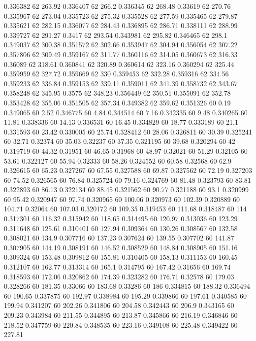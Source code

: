 0.336382 62 263.92
0.336407 62 266.2
0.336345 62 268.48
0.33619 62 270.76
0.335967 62 273.04
0.335723 62 275.32
0.335528 62 277.59
0.335465 62 279.87
0.335621 62 282.15
0.336077 62 284.43
0.336895 62 286.71
0.338111 62 288.99
0.339727 62 291.27
0.3417 62 293.54
0.343981 62 295.82
0.346465 62 298.1
0.349037 62 300.38
0.351572 62 302.66
0.353947 62 304.94
0.356054 62 307.22
0.357806 62 309.49
0.359167 62 311.77
0.360116 62 314.05
0.360673 62 316.33
0.36089 62 318.61
0.360841 62 320.89
0.360614 62 323.16
0.360294 62 325.44
0.359959 62 327.72
0.359669 62 330
0.359453 62 332.28
0.359316 62 334.56
0.359233 62 336.84
0.359153 62 339.11
0.359011 62 341.39
0.358732 62 343.67
0.358248 62 345.95
0.3575 62 348.23
0.356449 62 350.51
0.355091 62 352.78
0.353428 62 355.06
0.351505 62 357.34
0.349382 62 359.62
0.351326 60 0.19
0.349065 60 2.52
0.346775 60 4.84
0.344514 60 7.16
0.342335 60 9.48
0.340265 60 11.81
0.338336 60 14.13
0.336531 60 16.45
0.334829 60 18.77
0.333189 60 21.1
0.331593 60 23.42
0.330005 60 25.74
0.328412 60 28.06
0.326811 60 30.39
0.325241 60 32.71
0.32374 60 35.03
0.32237 60 37.35
0.321195 60 39.68
0.320294 60 42
0.319719 60 44.32
0.31951 60 46.65
0.31968 60 48.97
0.32021 60 51.29
0.32105 60 53.61
0.322127 60 55.94
0.32333 60 58.26
0.324552 60 60.58
0.32568 60 62.9
0.326615 60 65.23
0.327267 60 67.55
0.327588 60 69.87
0.327562 60 72.19
0.327203 60 74.52
0.326565 60 76.84
0.325724 60 79.16
0.324769 60 81.48
0.323793 60 83.81
0.322893 60 86.13
0.322134 60 88.45
0.321562 60 90.77
0.321188 60 93.1
0.320999 60 95.42
0.320947 60 97.74
0.320965 60 100.06
0.320973 60 102.39
0.320889 60 104.71
0.32064 60 107.03
0.320172 60 109.35
0.319453 60 111.68
0.318487 60 114
0.317301 60 116.32
0.315942 60 118.65
0.314495 60 120.97
0.313036 60 123.29
0.311648 60 125.61
0.310401 60 127.94
0.309364 60 130.26
0.308567 60 132.58
0.308021 60 134.9
0.307716 60 137.23
0.307624 60 139.55
0.307702 60 141.87
0.307905 60 144.19
0.308191 60 146.52
0.308529 60 148.84
0.308905 60 151.16
0.309324 60 153.48
0.309812 60 155.81
0.310405 60 158.13
0.311153 60 160.45
0.312107 60 162.77
0.313314 60 165.1
0.314795 60 167.42
0.31656 60 169.74
0.318593 60 172.06
0.320862 60 174.39
0.323282 60 176.71
0.32578 60 179.03
0.328266 60 181.35
0.33066 60 183.68
0.33286 60 186
0.334815 60 188.32
0.336494 60 190.65
0.337875 60 192.97
0.338984 60 195.29
0.339866 60 197.61
0.340585 60 199.94
0.341207 60 202.26
0.341806 60 204.58
0.342443 60 206.9
0.343165 60 209.23
0.343984 60 211.55
0.344895 60 213.87
0.345866 60 216.19
0.346846 60 218.52
0.347759 60 220.84
0.348535 60 223.16
0.349108 60 225.48
0.349422 60 227.81

